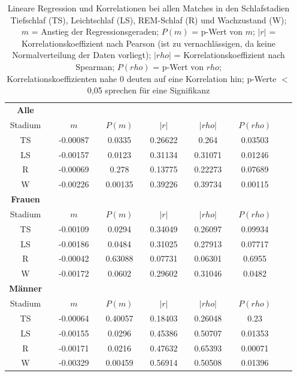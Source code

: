 


\begin{table}[H] 
\centering
\begin{tabularx}{0.85\textwidth}{ccccccccccccc}
\toprule
\textbf{Alle} & & & & & & & & & & & &\\  
\cmidrule{1-1}
Stadium & & $m$ & & $P(m)$ & & $|r|$ & & $|rho|$ & & $P(rho)$\\
\midrule
TS & & -0.00087 & & 0.0335 & & 0.26622 & & 0.264 & & 0.03503\\
LS & & -0.00157 & & 0.0123 & & 0.31134 & & 0.31071 & & 0.01246\\
R & & -0.00069 & & 0.278 & & 0.13775 & & 0.22273 & & 0.07689\\
W & & -0.00226 & & 0.00135 & & 0.39226 & & 0.39734 & & 0.00115\\
\midrule
\textbf{Frauen} & & & & & & & & & & & &\\  
\cmidrule{1-1}
Stadium & & $m$ & & $P(m)$ & & $|r|$ & & $|rho|$ & & $P(rho)$\\
\midrule
TS & & -0.00109 & & 0.0294 & & 0.34049 & & 0.26097 & & 0.09934\\
LS & & -0.00186 & & 0.0484 & & 0.31025 & & 0.27913 & & 0.07717\\
R & & -0.00042 & & 0.63088  & & 0.07731 & & 0.06301 & & 0.6955\\
W & & -0.00172 & & 0.0602 & & 0.29602 & & 0.31046 & & 0.0482\\
\midrule
\textbf{Männer} & & & & & & & & & & & &\\  
\cmidrule{1-1}
Stadium & & $m$ & & $P(m)$ & & $|r|$ & & $|rho|$ & & $P(rho)$\\
\midrule
TS & & -0.00064 & & 0.40057 & & 0.18403 & & 0.26048 & & 0.23\\
LS & & -0.00155 & & 0.0296 & & 0.45386 & & 0.50707 & & 0.01353\\
R & & -0.00171 & & 0.0216 & & 0.47632 & & 0.65393 & & 0.00071\\
W & & -0.00329 & & 0.00459 & & 0.56914 & & 0.50508 & & 0.01396\\
\bottomrule
\end{tabularx}
\caption[Lineare Regression und Korrelationen bei allen Matches]{Lineare Regression und Korrelationen bei allen Matches in den Schlafstadien Tiefschlaf (TS), Leichtschlaf (LS), \acs{REM}-Schlaf (R) und Wachzustand (W);\\
$m$ = Anstieg der Regressionsgeraden; $P(m)$ = p-Wert von $m$; $|r|$ = Korrelationskoeffizient nach Pearson (ist zu vernachlässigen, da keine Normalverteilung der Daten vorliegt); $|rho|$ = Korrelationskoeffizient nach Spearman; $P(rho)$ = p-Wert von $rho$;\\Korrelationskoeffizienten nahe 0 deuten auf eine Korrelation hin; p-Werte $<$ 0,05 sprechen für eine Signifikanz}
\label{tab:linregAlle}
\end{table}




